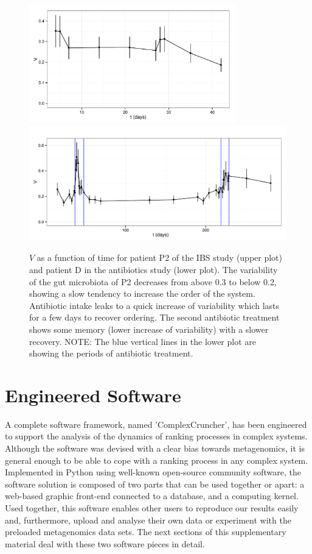 \documentclass[12pt,oneside,letterpaper]{article}
\begin{document}
\begin{figure}
	\centering 
 	\includegraphics[width=0.8\textwidth]{results/sliwin/patP2_IBS.pdf}
  	\includegraphics[width=1.0\textwidth]{results/sliwin/patD_antibio.pdf} 
\caption{$V$ as a function of time for patient P2 of the IBS study\cite{IBS} (upper plot) and patient D in the antibiotics study\cite{antibiotic} (lower plot). The variability 
of the gut microbiota of P2 decreases from above 0.3 to below 0.2, showing a slow tendency to increase the order of the system.  Antibiotic intake leaks to a quick increase of variability which lasts for a few days to recover ordering. The second antibiotic treatment shows some memory (lower increase of variability) with a slower recovery. NOTE: The blue vertical lines in the lower plot are showing the periods of antibiotic treatment.}
\label{fig:tempevo2}
\end{figure}

\section{Engineered Software}

A complete software framework, named 'ComplexCruncher', has been engineered to support the analysis of the dynamics of ranking processes in complex systems. Although the software was devised with a clear bias towards metagenomics, it is general enough to be able to cope with a ranking process in any complex system. Implemented in Python using well-known open-source community software, the software solution is composed of two parts that can be used together or apart: a web-based graphic front-end connected to a database, and a computing kernel. Used together, this software enables other users to reproduce our results easily and, furthermore, upload and analyse their own data or experiment with the preloaded metagenomics data sets. The next sections of this supplementary material deal with these two software pieces in detail.
\end{document}
